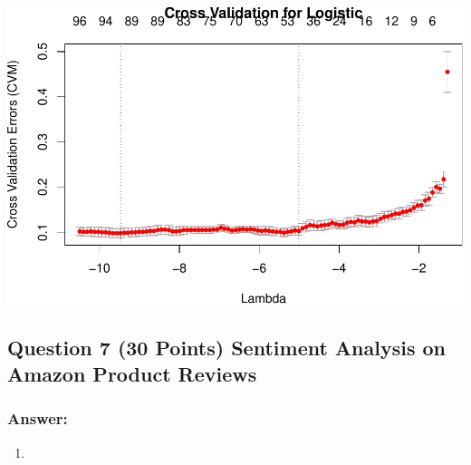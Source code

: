 \documentclass[
]{article}
\newenvironment{Shaded}{\begin{snugshade}}{\end{snugshade}}
\newcommand{\AttributeTok}[1]{\textcolor[rgb]{0.77,0.63,0.00}{#1}}
\newcommand{\DecValTok}[1]{\textcolor[rgb]{0.00,0.00,0.81}{#1}}
\newcommand{\FunctionTok}[1]{\textcolor[rgb]{0.00,0.00,0.00}{#1}}
\newcommand{\NormalTok}[1]{#1}
\newcommand{\OtherTok}[1]{\textcolor[rgb]{0.56,0.35,0.01}{#1}}
\newcommand{\SpecialCharTok}[1]{\textcolor[rgb]{0.00,0.00,0.00}{#1}}
\newcommand{\StringTok}[1]{\textcolor[rgb]{0.31,0.60,0.02}{#1}}
\providecommand{\tightlist}{%
  \setlength{\itemsep}{0pt}\setlength{\parskip}{0pt}}
\begin{document}
\begin{Shaded}
\end{Shaded}

\includegraphics{HW3_Wu-Yulun_files/figure-latex/unnamed-chunk-14-2.pdf}

\hypertarget{question-7-30-points-sentiment-analysis-on-amazon-product-reviews}{%
\subsection{Question 7 (30 Points) Sentiment Analysis on Amazon Product
Reviews}\label{question-7-30-points-sentiment-analysis-on-amazon-product-reviews}}

\hypertarget{answer-3}{%
\subsubsection{Answer:}\label{answer-3}}

\begin{enumerate}
\def\labelenumi{(\alph{enumi})}
\tightlist
\item
\end{enumerate}
\end{document}
